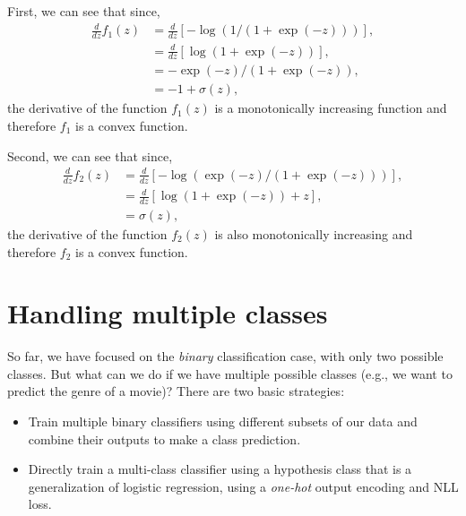   First, we can see that since,
  \begin{align*}
    \frac{d}{dz} f_1(z) & = \frac{d}{dz} \left[ -\log (1/(1 + \exp (-z))) \right], \\
                        & = \frac{d}{dz} \left[ \log (1 + \exp (-z)) \right],      \\
                        & = - \exp (-z) / (1 + \exp (-z)),                         \\
                        & = -1 + \sigma(z),
  \end{align*}
  the derivative of the function $f_1 (z)$ is a monotonically increasing function and
  therefore $f_1$ is a convex function.

  Second, we can see that since,
  \begin{align*}
    \frac{d}{dz} f_2(z) & = \frac{d}{dz} \left[ -\log (\exp(-z)/(1 + \exp (-z))) \right], \\
                        & = \frac{d}{dz} \left[ \log (1 + \exp (-z)) + z \right],         \\
                        & = \sigma(z),
  \end{align*}
  the derivative of the function $f_2(z)$ is also monotonically increasing and
  therefore $f_2$ is a convex function.

  \section{Handling multiple classes}

  So far, we have focused on the {\em binary} classification case, with
  only two possible classes.  But what can we do if we have multiple
  possible classes (e.g., we want to predict the genre of a movie)?
  There are two basic strategies:
  \begin{itemize}
    \item Train multiple binary classifiers using different subsets of
          our data and combine their outputs to make a class prediction.
    \item Directly train a multi-class classifier using a hypothesis
          class that is a generalization of logistic regression, using a
            {\em one-hot} output encoding and NLL loss.
  \end{itemize}



